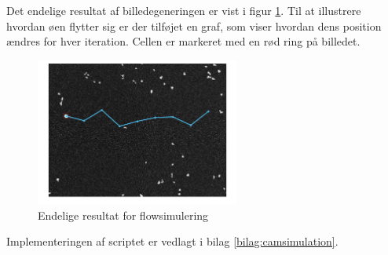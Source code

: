 Det endelige resultat af billedegeneringen er vist i figur \ref{fig:finalresult}. Til at illustrere hvordan øen flytter sig er der tilføjet en graf, som viser hvordan dens position ændres for hver iteration. Cellen er markeret med en rød ring på billedet.

\begin{figure}[H]
	\centering
	\includegraphics[width=0.6\textwidth]{billeder/software/final.png}
	\caption{Endelige resultat for flowsimulering}
	\label{fig:finalresult}
\end{figure}

Implementeringen af scriptet er vedlagt i bilag \ref{bilag:camsimulation}.